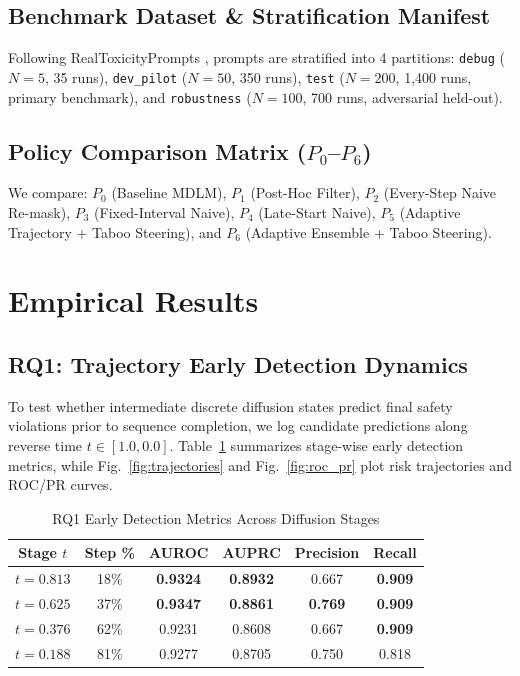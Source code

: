 \documentclass[conference]{IEEEtran}
\begin{document}
\subsection{Benchmark Dataset & Stratification Manifest}
Following RealToxicityPrompts \cite{gehman2020realtoxicityprompts}, prompts are stratified into 4 partitions: \texttt{debug} ($N=5$, 35 runs), \texttt{dev\_pilot} ($N=50$, 350 runs), \texttt{test} ($N=200$, 1,400 runs, primary benchmark), and \texttt{robustness} ($N=100$, 700 runs, adversarial held-out).

\subsection{Policy Comparison Matrix ($P_0$--$P_6$)}
We compare: $P_0$ (Baseline MDLM), $P_1$ (Post-Hoc Filter), $P_2$ (Every-Step Naive Re-mask), $P_3$ (Fixed-Interval Naive), $P_4$ (Late-Start Naive), $P_5$ (Adaptive Trajectory + Taboo Steering), and $P_6$ (Adaptive Ensemble + Taboo Steering).

\section{Empirical Results}

\subsection{RQ1: Trajectory Early Detection Dynamics}
To test whether intermediate discrete diffusion states predict final safety violations prior to sequence completion, we log candidate predictions along reverse time $t \in [1.0, 0.0]$. Table~\ref{tab:rq1} summarizes stage-wise early detection metrics, while Fig.~\ref{fig:trajectories} and Fig.~\ref{fig:roc_pr} plot risk trajectories and ROC/PR curves.

\begin{table}[!t]
\centering
\caption{RQ1 Early Detection Metrics Across Diffusion Stages}
\label{tab:rq1}
\footnotesize
\setlength{\tabcolsep}{3.5pt}
\begin{tabular}{cccccc}
\toprule
\textbf{Stage $t$} & \textbf{Step \%} & \textbf{AUROC} & \textbf{AUPRC} & \textbf{Precision} & \textbf{Recall} \\
\midrule
$t = 0.813$ & 18\% & \textbf{0.9324} & \textbf{0.8932} & 0.667 & \textbf{0.909} \\
$t = 0.625$ & 37\% & \textbf{0.9347} & \textbf{0.8861} & \textbf{0.769} & \textbf{0.909} \\
$t = 0.376$ & 62\% & 0.9231 & 0.8608 & 0.667 & \textbf{0.909} \\
$t = 0.188$ & 81\% & 0.9277 & 0.8705 & 0.750 & 0.818 \\
\bottomrule
\end{tabular}
\end{table}
\end{document}
